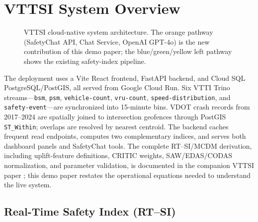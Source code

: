 \documentclass[sigconf]{acmart}
\begin{document}
\section{VTTSI System Overview}
\label{sec:system}

\begin{figure}[t]
\centering
\resizebox{\textwidth}{!}{%
%
}
\caption{VTTSI cloud-native system architecture. The orange pathway
  (SafetyChat API, Chat Service, OpenAI GPT-4o) is the new contribution of
  this demo paper; the blue/green/yellow left pathway shows the existing
  safety-index pipeline.}
\label{fig:architecture}
\end{figure}

The deployment uses a Vite React frontend, FastAPI backend, and Cloud SQL
PostgreSQL/PostGIS, all served from Google Cloud Run.
Six VTTI Trino streams---\texttt{bsm}, \texttt{psm},
\texttt{vehicle-count}, \texttt{vru-count}, \texttt{speed-distribution},
and \texttt{safety-event}---are synchronized into 15-minute bins.
VDOT crash records from 2017--2024 are spatially joined to intersection
geofences through PostGIS \texttt{ST\_Within}; overlaps are resolved by
nearest centroid.
The backend caches frequent read endpoints, computes two complementary
indices, and serves both dashboard panels and SafetyChat tools. The complete
RT--SI/MCDM derivation, including uplift-feature definitions, CRITIC weights,
SAW/EDAS/CODAS normalization, and parameter validation, is documented in the
companion VTTSI paper \cite{cusati2025agentickg}; this demo paper restates the
operational equations needed to understand the live system.

\subsection{Real-Time Safety Index (RT--SI)}
\end{document}
